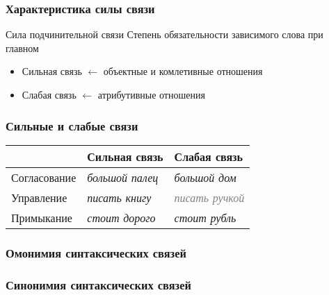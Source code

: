 \begin{frame}
  \frametitle{Характеристика силы связи}

  \begin{alertblock}{Сила подчинительной связи}
     Степень обязательности зависимого слова при главном
  \end{alertblock}

  \vfill

  \begin{itemize}
    \item Сильная связь $\leftarrow$ объектные и комлетивные отношения
    \item Слабая связь $\leftarrow$ атрибутивные отношения
  \end{itemize}
\end{frame}

\begin{frame}
  \frametitle{Сильные и слабые связи}

  \begin{table}
    \begin{tabularx}{.9\textwidth}{XXX}
      & Сильная связь & Слабая связь \\ \midrule \midrule
      Согласование & \textit{большой палец} & \textit{большой дом} \\ \midrule
      Управление & \textit{писать книгу} & \textcolor{gray}{\textit{писать ручкой}} \\ \midrule
      Примыкание & \textit{стоит дорого} & \textit{стоит рубль} \\
    \end{tabularx}
  \end{table}
\end{frame}

\begin{frame}
  \frametitle{Омонимия синтаксических связей}

\end{frame}

\begin{frame}
  \frametitle{Синонимия синтаксических связей}

\end{frame}
